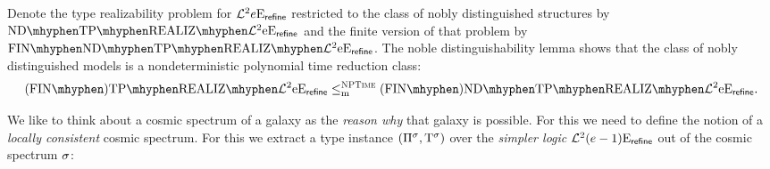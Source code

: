 Denote the type realizability problem for $\mathcal{L}^{2}{e}\mathrm{E}_{\mathsf{refine}}$ restricted to
the class of nobly distinguished structures by $\NDReal{\vFo2\Eea\sze\agrefine}$ and the finite
version of that problem by $\FinNDReal{\vFo2\Eea\sze\agrefine}$.
The noble distinguishability lemma shows that the class of nobly distinguished
models is a nondeterministic polynomial time reduction class:
\[
  \FinAReal{\vFo2\Eea\sze\agrefine} \red{\cNP} \FinANDReal{\vFo2\Eea\sze\agrefine}.
\]

We like to think about a cosmic spectrum of a galaxy as the \emph{reason why}
that galaxy is possible. For this we need to define the notion of a
\emph{locally consistent} cosmic spectrum. For this we extract a type instance
$(\Pi^{\sigma},\mathrm{T}^{\sigma})$ over the \emph{simpler logic}
$\mathcal{L}^{2}_{{}}{(e-1)}\mathrm{E}_{\mathsf{refine}}$ out of the cosmic spectrum $\sigma$:
